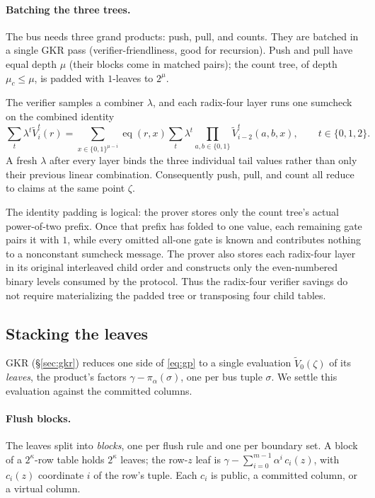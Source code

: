 \documentclass[11pt]{article}
\newcommand{\eq}{\operatorname{eq}}
\newcommand{\cube}[1]{\{0,1\}^{#1}}
\begin{document}
\paragraph{Batching the three trees.} The bus needs three grand products: push, pull, and counts. They are batched in a single GKR pass (verifier-friendliness, good for recursion). Push and pull have equal depth $\mu$ (their blocks come in matched pairs); the count tree, of depth $\mu_c\le\mu$, is padded with $1$-leaves to $2^{\mu}$.

The verifier samples a combiner $\lambda$, and each radix-four layer runs one sumcheck on the combined identity
\[
\sum_t\lambda^t\widetilde V_i^t(r)=\sum_{x\in\cube{\mu-i}}\eq(r,x)\sum_t\lambda^t\prod_{a,b\in\{0,1\}}\widetilde V_{i-2}^t(a,b,x),\qquad t\in\{0,1,2\}.
\]
A fresh $\lambda$ after every layer binds the three individual tail values rather than only their previous linear combination. Consequently push, pull, and count all reduce to claims at the same point $\zeta$.

The identity padding is logical: the prover stores only the count tree's actual power-of-two prefix. Once that prefix has folded to one value, each remaining gate pairs it with $1$, while every omitted all-one gate is known and contributes nothing to a nonconstant sumcheck message. The prover also stores each radix-four layer in its original interleaved child order and constructs only the even-numbered binary levels consumed by the protocol. Thus the radix-four verifier savings do not require materializing the padded tree or transposing four child tables.

\subsection{Stacking the leaves}\label{sec:leafstack}

GKR (\S\ref{sec:gkr}) reduces one side of \eqref{eq:gp} to a single evaluation $\widetilde V_0(\zeta)$ of its \emph{leaves}, the product's factors $\gamma-\pi_\alpha(\sigma)$, one per bus tuple $\sigma$. We settle this evaluation against the committed columns.

\paragraph{Flush blocks.} The leaves split into \emph{blocks}, one per flush rule and one per boundary set. A block of a $2^{\kappa}$-row table holds $2^{\kappa}$ leaves; the row-$z$ leaf is $\gamma-\sum_{i=0}^{m-1}\alpha^{i}\,c_{i}(z)$, with $c_{i}(z)$ coordinate $i$ of the row's tuple. Each $c_i$ is public, a committed column, or a virtual column.
\end{document}
